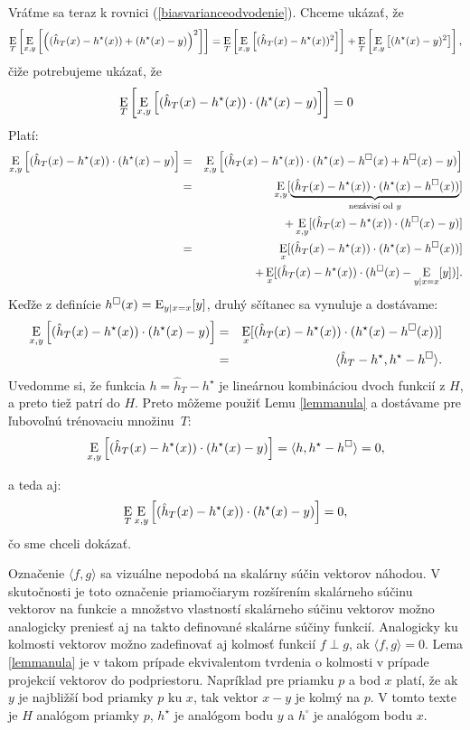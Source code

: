 \noindent
Vráťme sa teraz k rovnici (\ref{biasvarianceodvodenie}). Chceme ukázať, že
$$\operatorname*{\mathrm{E}}_T \left[ \operatorname*{\mathrm{E}}_{x,y} \left[ \left( (\hat{h}_T(x) - h^\star(x)) + (h^\star(x) - y) \right)^2 \right] \right] = \operatorname*{\mathrm{E}}_T \left[ \operatorname*{\mathrm{E}}_{x,y} \left[ (\hat{h}_T(x) - h^\star(x))^2 \right] \right] + \operatorname*{\mathrm{E}}_T \left[ \operatorname*{\mathrm{E}}_{x,y} \left[ (h^\star(x) - y)^2 \right] \right],$$
čiže potrebujeme ukázať, že
$$\operatorname*{\mathrm{E}}_T \left[ \operatorname*{\mathrm{E}}_{x, y} \left[ (\hat{h}_T(x) - h^\star(x)) \cdot (h^\star(x) - y) \right] \right] = 0$$
Platí:
\begin{eqnarray*}
\operatorname*{\mathrm{E}}_{x, y} \left[ (\hat{h}_T(x) - h^\star(x)) \cdot (h^\star(x) - y) \right] &=&
\operatorname*{\mathrm{E}}_{x,y} \left[ (\hat{h}_T(x) - h^\star(x)) \cdot (h^\star(x) - h^{\square}(x) + h^{\square}(x) - y) \right]\\
&=& \operatorname*{\mathrm{E}}_{x,y} [ \underbrace{(\hat{h}_T(x) - h^\star(x)) \cdot (h^\star(x) - h^{\square}(x))}_{\text{nezávisí od $y$}}]\\
&&+ \operatorname*{\mathrm{E}}_{x,y} [ (\hat{h}_T(x) - h^\star(x)) \cdot (h^{\square}(x) - y)]\\
&=& \operatorname*{\mathrm{E}}_x [ (\hat{h}_T(x) - h^\star(x)) \cdot (h^\star(x) - h^{\square}(x)) ]\\
&&+ \operatorname*{\mathrm{E}}_x [ (\hat{h}_T(x) - h^\star(x)) \cdot (h^{\square}(x) - \operatorname*{\mathrm{E}}_{y|x=x}[y]) ].
\end{eqnarray*}
Keďže z definície $h^{\square}(x) = \operatorname*{\mathrm{E}}_{y|x=x}[y]$, druhý sčítanec sa vynuluje a
dostávame:
\begin{eqnarray*}
  \operatorname*{\mathrm{E}}_{x, y} \left[ (\hat{h}_T(x) - h^\star(x)) \cdot (h^\star(x) - y) \right] &=&
  \operatorname*{\mathrm{E}}_x [ (\hat{h}_T(x) - h^\star(x)) \cdot (h^\star(x) - h^{\square}(x)) ]\\
  &=& \langle \hat{h}_T-h^\star, h^\star-h^\square\rangle.
\end{eqnarray*}
Uvedomme si, že funkcia $h=\hat{h}_T-h^\star$ je lineárnou kombináciou dvoch
funkcií z $H$, a preto tiež patrí do $H$. Preto môžeme použiť Lemu \ref{lemmanula} a dostávame pre ľubovoľnú trénovaciu množinu~$T$:
$$
  \operatorname*{\mathrm{E}}_{x, y} \left[ (\hat{h}_T(x) - h^\star(x)) \cdot (h^\star(x) - y) \right]
  = \langle h, h^\star-h^\square\rangle\\
  = 0,$$
  
a teda aj:
$$\operatorname*{\mathrm{E}}_T\operatorname*{\mathrm{E}}_{x, y} \left[ (\hat{h}_T(x) - h^\star(x)) \cdot (h^\star(x) - y) \right]=0,$$
čo sme chceli dokázať.

\begin{remark}
  Označenie $\langle f,g \rangle$ sa vizuálne nepodobá na skalárny
  súčin vektorov náhodou. V skutočnosti je toto označenie priamočiarym
  rozšírením skalárneho súčinu vektorov na funkcie a množstvo
  vlastností skalárneho súčinu vektorov možno analogicky preniesť aj
  na takto definované skalárne súčiny funkcií. Analogicky ku kolmosti
  vektorov možno zadefinovať aj kolmosť funkcií $f\perp g$, ak
  $\langle f,g \rangle = 0$. Lema \ref{lemmanula} je v takom prípade
  ekvivalentom tvrdenia o kolmosti v prípade projekcií vektorov do
  podpriestoru. Napríklad pre priamku $p$ a bod $x$ platí, že ak $y$
  je najbližší bod priamky $p$ ku $x$, tak vektor $x-y$ je kolmý na $p$.
  V tomto texte je $H$ analógom priamky $p$, $h^\star$ je analógom bodu $y$ a
  $h^\square$ je analógom bodu $x$.
\end{remark}

